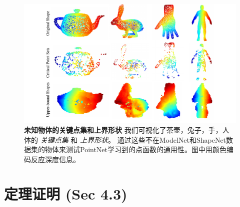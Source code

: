  
\begin{figure}[t!]
\centering
\includegraphics[width=\linewidth]{fig/unseen.pdf}
\caption{\textbf{未知物体的关键点集和上界形状} 我们可视化了茶壶，兔子，手，人体的 \textit{关键点集} 和 \textit{上界形状}。 通过这些不在ModelNet和ShapeNet数据集的物体来测试PointNet学习到的点函数的通用性。图中用颜色编码反应深度信息。}
\label{fig:unseen}
\end{figure}

\section{定理证明 (Sec 4.3)}
\label{sec:proof}



